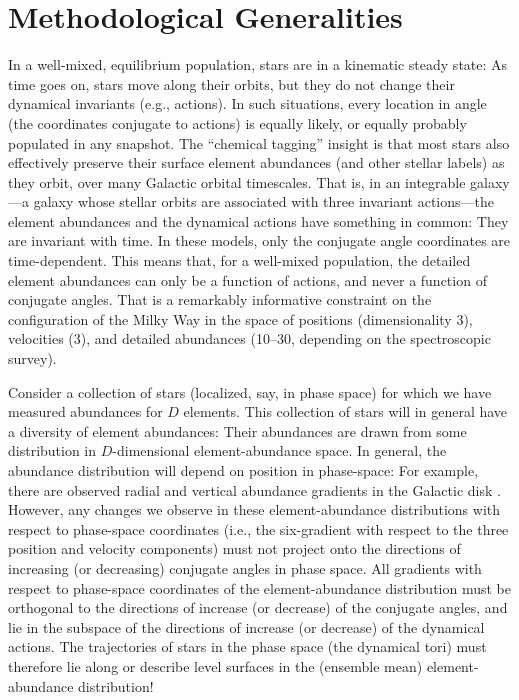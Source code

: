 \documentclass[modern]{aastex63}
\begin{document}
\section{Methodological Generalities}
\label{sec:generalities}

In a well-mixed, equilibrium population, stars are in a kinematic steady state:
As time goes on, stars move along their orbits, but they do not change their
dynamical invariants (e.g., actions).
In such situations, every location in angle (the coordinates conjugate to
actions) is equally likely, or equally probably populated in any snapshot.
The ``chemical tagging'' insight \citep{Freeman:2002} is that most stars also
effectively preserve their surface element abundances (and other stellar labels)
as they orbit, over many Galactic orbital timescales.
That is, in an integrable galaxy---a galaxy whose stellar orbits are associated
with three invariant actions---the element abundances and the dynamical actions
have something in common: They are invariant with time.
In these models, only the conjugate angle coordinates are time-dependent.
This means that, for a well-mixed population, the detailed element abundances
can only be a function of actions, and never a function of conjugate angles.
That is a remarkably informative constraint on the configuration of the Milky
Way in the space of positions (dimensionality 3), velocities (3), and
detailed abundances (10--30, depending on the spectroscopic survey).

Consider a collection of stars (localized, say, in phase space) for which we
have measured abundances for $D$ elements.
This collection of stars will in general have a diversity of element abundances:
Their abundances are drawn from some distribution in $D$-dimensional
element-abundance space.
In general, the abundance distribution will depend on position in phase-space:
For example, there are observed radial and vertical abundance gradients in the
Galactic disk \citep[e.g.,][]{Hayden:2015}.
However, any changes we observe in these element-abundance distributions with
respect to phase-space coordinates (i.e., the six-gradient with respect to the
three position and velocity components) must not project onto the directions of
increasing (or decreasing) conjugate angles in phase space.
All gradients with respect to phase-space coordinates of the element-abundance
distribution must be orthogonal to the directions of increase (or decrease) of
the conjugate angles, and lie in the subspace of the directions of increase (or
decrease) of the dynamical actions.
The trajectories of stars in the phase space (the dynamical tori) must therefore
lie along or describe level surfaces in the (ensemble mean) element-abundance
distribution!
\end{document}
